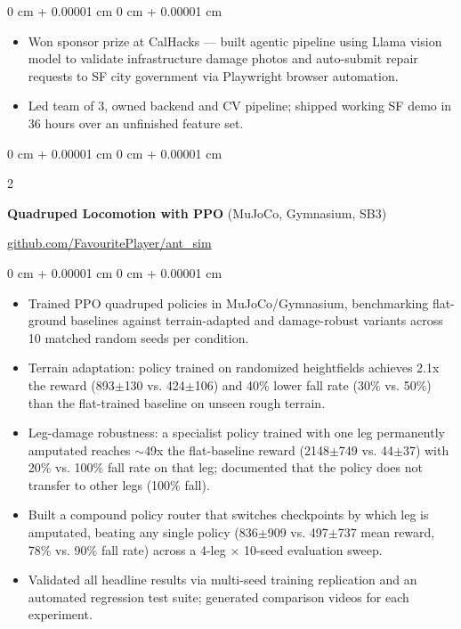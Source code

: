 \documentclass[10pt, letterpaper]{article}
\newenvironment{highlights}{
    \begin{itemize}[
        topsep=0.3 cm,
        parsep=0.05 cm,
        partopsep=0pt,
        itemsep=0.02 cm,
        leftmargin=0 cm + 10pt
    ]
}{
    \end{itemize}
} %
\newenvironment{onecolentry}{
    \begin{adjustwidth}{
        0 cm + 0.00001 cm
    }{
        0 cm + 0.00001 cm
    }
}{
    \end{adjustwidth}
} %
\newenvironment{extendedtwocolentry}[2][]{
    \onecolentry
    \def\secondColumn{#2}
    \setcolumnwidth{\fill, 8 cm}
    \begin{paracol}{2}
}{
    \switchcolumn \raggedleft \secondColumn
    \end{paracol}
    \endonecolentry
}
\begin{document}
        \vspace{0.10 cm}
        \begin{onecolentry}
            \begin{highlights}
                \item Won sponsor prize at CalHacks — built agentic pipeline using Llama vision model to validate infrastructure damage photos and auto-submit repair requests to SF city government via Playwright browser automation.
                \item Led team of 3, owned backend and CV pipeline; shipped working SF demo in 36 hours over an unfinished feature set.
            \end{highlights}
        \end{onecolentry}

        \begin{extendedtwocolentry}{
            \href{https://github.com/FavouritePlayer/ant_sim}{github.com/FavouritePlayer/ant\_sim}
        }
            \textbf{Quadruped Locomotion with PPO} (MuJoCo, Gymnasium, SB3)
        \end{extendedtwocolentry}

        \vspace{0.10 cm}
        \begin{onecolentry}
            \begin{highlights}
                \item Trained PPO quadruped policies in MuJoCo/Gymnasium, benchmarking flat-ground baselines against terrain-adapted and damage-robust variants across 10 matched random seeds per condition.
                \item Terrain adaptation: policy trained on randomized heightfields achieves 2.1x the reward (893$\pm$130 vs. 424$\pm$106) and 40\% lower fall rate (30\% vs. 50\%) than the flat-trained baseline on unseen rough terrain.
                \item Leg-damage robustness: a specialist policy trained with one leg permanently amputated reaches $\sim$49x the flat-baseline reward (2148$\pm$749 vs. 44$\pm$37) with 20\% vs. 100\% fall rate on that leg; documented that the policy does not transfer to other legs (100\% fall).
                \item Built a compound policy router that switches checkpoints by which leg is amputated, beating any single policy (836$\pm$909 vs. 497$\pm$737 mean reward, 78\% vs. 90\% fall rate) across a 4-leg $\times$ 10-seed evaluation sweep.
                \item Validated all headline results via multi-seed training replication and an automated regression test suite; generated comparison videos for each experiment.
            \end{highlights}
        \end{onecolentry}
\end{document}
